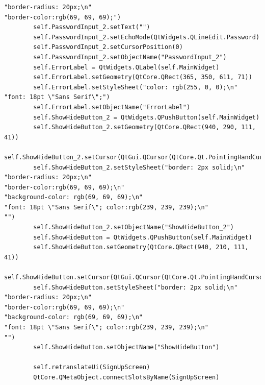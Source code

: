 \documentclass{article}
\begin{document}
\begin{lstlisting}
"border-radius: 20px;\n"
"border-color:rgb(69, 69, 69);")
        self.PasswordInput_2.setText("")
        self.PasswordInput_2.setEchoMode(QtWidgets.QLineEdit.Password)
        self.PasswordInput_2.setCursorPosition(0)
        self.PasswordInput_2.setObjectName("PasswordInput_2")
        self.ErrorLabel = QtWidgets.QLabel(self.MainWidget)
        self.ErrorLabel.setGeometry(QtCore.QRect(365, 350, 611, 71))
        self.ErrorLabel.setStyleSheet("color: rgb(255, 0, 0);\n"
"font: 18pt \"Sans Serif\";")
        self.ErrorLabel.setObjectName("ErrorLabel")
        self.ShowHideButton_2 = QtWidgets.QPushButton(self.MainWidget)
        self.ShowHideButton_2.setGeometry(QtCore.QRect(940, 290, 111, 41))
        self.ShowHideButton_2.setCursor(QtGui.QCursor(QtCore.Qt.PointingHandCursor))
        self.ShowHideButton_2.setStyleSheet("border: 2px solid;\n"
"border-radius: 20px;\n"
"border-color:rgb(69, 69, 69);\n"
"background-color: rgb(69, 69, 69);\n"
"font: 18pt \"Sans Serif\"; color:rgb(239, 239, 239);\n"
"")
        self.ShowHideButton_2.setObjectName("ShowHideButton_2")
        self.ShowHideButton = QtWidgets.QPushButton(self.MainWidget)
        self.ShowHideButton.setGeometry(QtCore.QRect(940, 210, 111, 41))
        self.ShowHideButton.setCursor(QtGui.QCursor(QtCore.Qt.PointingHandCursor))
        self.ShowHideButton.setStyleSheet("border: 2px solid;\n"
"border-radius: 20px;\n"
"border-color:rgb(69, 69, 69);\n"
"background-color: rgb(69, 69, 69);\n"
"font: 18pt \"Sans Serif\"; color:rgb(239, 239, 239);\n"
"")
        self.ShowHideButton.setObjectName("ShowHideButton")

        self.retranslateUi(SignUpScreen)
        QtCore.QMetaObject.connectSlotsByName(SignUpScreen)


\end{lstlisting}
\end{document}
